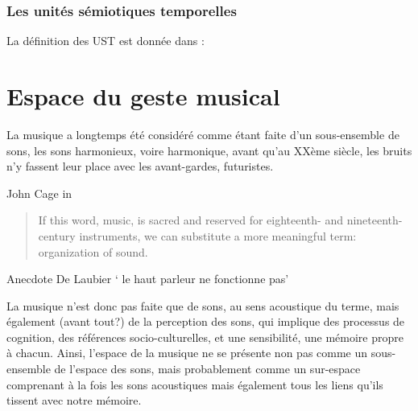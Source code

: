 \subsubsection{Les unités sémiotiques temporelles}

La définition des UST est donnée dans \cite{timsit-berthier_les_2004}:



\section*{Espace du geste musical}
La musique a longtemps été considéré comme étant faite d'un sous-ensemble de sons, les sons harmonieux, voire harmonique, avant qu'au XXème siècle, les bruits n'y fassent leur place avec les avant-gardes, futuristes. 

John Cage in \cite{cage_silence:_1961}
\begin{quotation}
\noindent If this word, music, is sacred and reserved for eighteenth- and nineteenth-century instruments, we can substitute a more meaningful term: organization of sound.\\
\end{quotation}


Anecdote De Laubier ` le haut parleur ne fonctionne pas'

La musique n'est donc pas faite que de sons, au sens acoustique du terme, mais également (avant tout?) de la perception des sons, qui implique des processus de cognition, des références socio-culturelles, et une sensibilité, une mémoire propre à chacun. 
Ainsi, l'espace de la musique ne se présente non pas comme un sous-ensemble de l'espace des sons, mais probablement comme un sur-espace comprenant à la fois les sons acoustiques mais également tous les liens qu'ils tissent avec notre mémoire.

